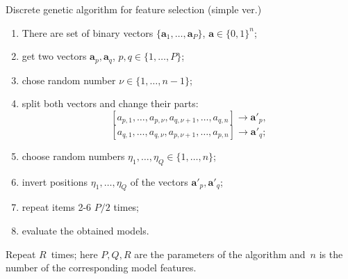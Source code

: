 \documentclass{beamer}
\begin{document}
\begin{frame}[t]{Discrete genetic algorithm for feature selection (simple ver.)}
\vfill
\begin{enumerate}
\item There are set of binary vectors $\{\mathbf{a}_1,\ldots,\mathbf{a}_P\}$, $\mathbf{a}\in\{0,1\}^n$;
\item get two vectors $\mathbf{a}_p, \mathbf{a}_q$, $p,q\in\{1,\ldots,P\}$;
\item chose random number $\nu\in \{1,\ldots,n-1\}$;
\item split both vectors and change their parts:
$$[a_{p,1},\ldots,a_{p,\nu},a_{q,\nu+1},\ldots,a_{q,n}]\to\mathbf{a'}_p,$$
$$[a_{q,1},\ldots,a_{q,\nu},a_{p,\nu+1},\ldots,a_{p,n}]\to\mathbf{a'}_q;$$
\item choose random numbers $\eta_1,\ldots,\eta_Q\in\{1,\ldots,n\}$;
\item invert positions $\eta_1,\ldots,\eta_Q$ of the vectors $\mathbf{a'}_p,\mathbf{a'}_q$;
\item repeat items 2-6 $P/2$ times;
\item evaluate the obtained models.
\end{enumerate}
\vfill
Repeat $R$~times; here $P,Q,R$ are the parameters of the algorithm and~$n$ is the number of the corresponding model features.
\end{frame}
\end{document}
